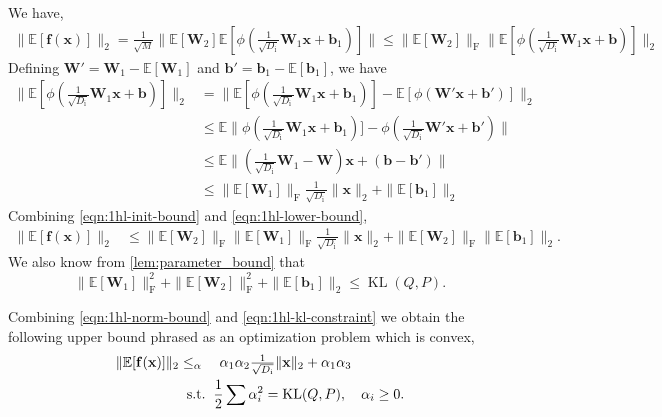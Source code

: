 \documentclass[twoside]{article}
\renewcommand{\ss}[1]{_{\text{#1}}}
\newcommand{\vb}{\mathbf{b}}
\newcommand{\vf}{\mathbf{f}}
\newcommand{\vx}{\mathbf{x}}
\newcommand{\mW}{\mathbf{W}}
\newcommand{\E}{\mathbb{E}}
\renewcommand{\P}{\mathbb{P}}
\newcommand{\Q}{\mathbb{Q}}
\renewcommand{\Q}{\ensuremath{Q}}
\renewcommand{\P}{\ensuremath{P}}
\newcommand{\opspace}{}
\let\max\relax\DeclareMathOperator*{\max}{max\opspace}
\newcommand{\KL}{\operatorname{KL}}
\renewcommand{\ss}[1]{_{\text{#1}}}        %
\theoremstyle{theoremstyle}
\begin{document}
We have,
\begin{align}
    \|\E[\vf(\vx)]\|_2 = \tfrac1{\sqrt{M}} \|\E[\mW_2]\E[\phi(\tfrac{1}{\sqrt{D\ss{i}}}\mW_1\vx+\vb_1)]\| \leq \|\E[\mW_2]\|\ss{F}\|\E[\phi(\tfrac{1}{\sqrt{D\ss{i}}}\mW_1\vx+\vb)]\|_2 \label{eqn:1hl-init-bound}
\end{align}
Defining $\mW' = \mW_1 - \E[\mW_1]$ and $\vb' = \vb_1 - \E[\vb_1]$, we have 
\begin{align}
    \|\E[\phi(\tfrac{1}{\sqrt{D\ss{i}}}\mW_1\vx+\vb)]\|_2  &= \|\E[\phi(\tfrac{1}{\sqrt{D\ss{i}}}\mW_1\vx+\vb_1)] -\E[\phi(\mW'\vx+\vb')] \|_2 \\
    & \leq \E\|\phi(\tfrac{1}{\sqrt{D\ss{i}}}\mW_1\vx+\vb_1)] -\phi(\tfrac{1}{\sqrt{D\ss{i}}}\mW'\vx+\vb')\| \\
    & \leq \E\|(\tfrac{1}{\sqrt{D\ss{i}}}\mW_1-\mW)\vx+(\vb-\vb')\|\\
    & \leq \|\E[\mW_1]\|\ss{F}\tfrac{1}{\sqrt{D\ss{i}}}\|\vx\|_2 + \|\E[\vb_1]\|_2 \label{eqn:1hl-lower-bound}
\end{align}
Combining \cref{eqn:1hl-init-bound} and \cref{eqn:1hl-lower-bound}, 
\begin{align}
    \|\E[\vf(\vx)]\|_2 &\leq  \|\E[\mW_2]\|\ss{F}\|\E[\mW_1]\|\ss{F}\tfrac{1}{\sqrt{D\ss{i}}}\|\vx\|_2 + \|\E[\mW_2]\|\ss{F}\|\E[\vb_1]\|_2.\label{eqn:1hl-norm-bound}
\end{align}
We also know from \cref{lem:parameter_bound} that
\begin{equation}
    \|\E[\mW_1]\|\ss{F}^2+\|\E[\mW_2]\|\ss{F}^2+ \|\E[\vb_1]\|_2 \leq \KL(\Q,\P).\label{eqn:1hl-kl-constraint}
\end{equation}


Combining \cref{eqn:1hl-norm-bound} and \cref{eqn:1hl-kl-constraint} we obtain the following upper bound phrased as an optimization problem which is convex, 
\begin{align}
   \|\E[\vf(\vx)]\|_2 &\leq 
   \max_{\alpha} \quad \alpha_1\alpha_2 \tfrac{1}{\sqrt{D\ss{i}}}\|\vx\|_2+\alpha_1\alpha_3 \\
    & \;\; \text{s.t.} \; \;
    \frac{1}{2}\sum \alpha_i^2 = \KL(\Q,\P),\quad  \alpha_i  \geq 0.
\end{align}
\end{document}
